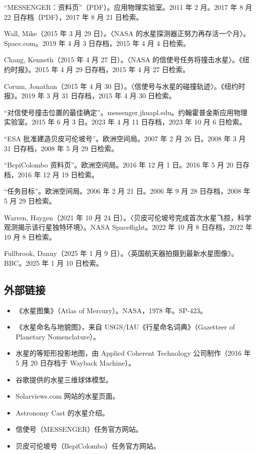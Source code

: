 \begin{enumerate}
“MESSENGER：资料页”（PDF）。应用物理实验室。2011 年 2 月。2017 年 8 月 22 日存档（PDF），2017 年 8 月 21 日检索。

Wall, Mike（2015 年 3 月 29 日）。〈NASA 的水星探测器正努力再存活一个月〉。Space.com。2019 年 4 月 3 日存档，2015 年 4 月 4 日检索。

Chang, Kenneth（2015 年 4 月 27 日）。〈NASA 的信使号任务将撞击水星〉。《纽约时报》。2015 年 4 月 29 日存档，2015 年 4 月 27 日检索。

Corum, Jonathan（2015 年 4 月 30 日）。〈信使号与水星的碰撞轨迹〉。《纽约时报》。2019 年 3 月 31 日存档，2015 年 4 月 30 日检索。

“对信使号撞击位置的最佳确定”。messenger.jhuapl.edu。约翰霍普金斯应用物理实验室。2015 年 6 月 3 日。2023 年 4 月 11 日存档，2023 年 10 月 6 日检索。

“ESA 批准建造贝皮可伦坡号”。欧洲空间局。2007 年 2 月 26 日。2008 年 3 月 31 日存档，2008 年 5 月 29 日检索。

“BepiColombo 资料页”。欧洲空间局。2016 年 12 月 1 日。2016 年 5 月 20 日存档，2016 年 12 月 19 日检索。

“任务目标”。欧洲空间局。2006 年 2 月 21 日。2006 年 9 月 28 日存档，2008 年 5 月 29 日检索。

Warren, Haygen（2021 年 10 月 24 日）。〈贝皮可伦坡号完成首次水星飞掠，科学观测揭示该行星独特环境〉。NASA Spaceflight。2022 年 10 月 8 日存档，2022 年 10 月 8 日检索。

Fullbrook, Danny（2025 年 1 月 9 日）。〈英国航天器拍摄到最新水星图像〉。BBC。2025 年 1 月 10 日检索。

\end{enumerate}
\subsection{外部链接}
\begin{itemize}
\item 《水星图集》（Atlas of Mercury）。NASA，1978 年。SP-423。
\item 《水星命名与地貌图》，来自 USGS/IAU《行星命名词典》（Gazetteer of Planetary Nomenclature）。
\item 水星的等矩形投影地图，由 Applied Coherent Technology 公司制作（2016 年 5 月 20 日存档于 Wayback Machine）。
\item 谷歌提供的水星三维球体模型。
\item Solarviews.com 网站的水星页面。
\item Astronomy Cast 的水星介绍。
\item 信使号（MESSENGER）任务官方网站。
\item 贝皮可伦坡号（BepiColombo）任务官方网站。
\end{itemize}










